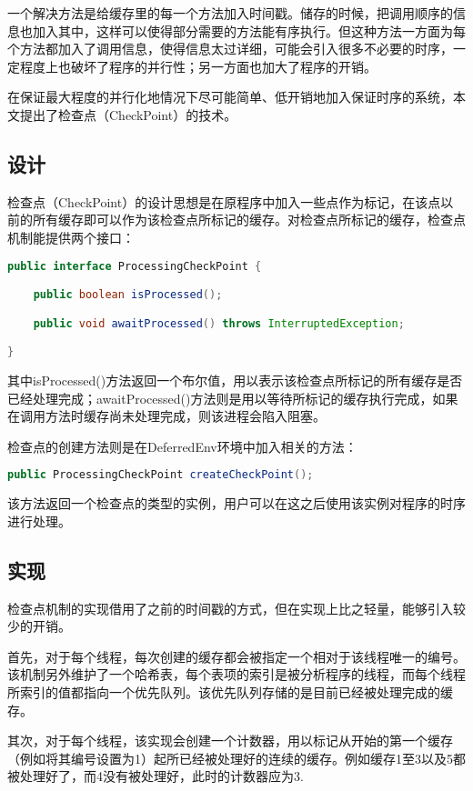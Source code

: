一个解决方法是给缓存里的每一个方法加入时间戳。储存的时候，把调用顺序的信息也加入其中，这样可以使得部分需要的方法能有序执行。但这种方法一方面为每个方法都加入了调用信息，使得信息太过详细，可能会引入很多不必要的时序，一定程度上也破坏了程序的并行性；另一方面也加大了程序的开销。

在保证最大程度的并行化地情况下尽可能简单、低开销地加入保证时序的系统，本文提出了检查点（CheckPoint）的技术。

\subsection{设计}

检查点（CheckPoint）的设计思想是在原程序中加入一些点作为标记，在该点以前的所有缓存即可以作为该检查点所标记的缓存。对检查点所标记的缓存，检查点机制能提供两个接口：

\begin{lstlisting}[language=Java]
public interface ProcessingCheckPoint {

	public boolean isProcessed();

	public void awaitProcessed() throws InterruptedException;

}
\end{lstlisting}

其中isProcessed()方法返回一个布尔值，用以表示该检查点所标记的所有缓存是否已经处理完成；awaitProcessed()方法则是用以等待所标记的缓存执行完成，如果在调用方法时缓存尚未处理完成，则该进程会陷入阻塞。

检查点的创建方法则是在DeferredEnv环境中加入相关的方法：

\begin{lstlisting}[language=Java]
	public ProcessingCheckPoint createCheckPoint();
\end{lstlisting}

该方法返回一个检查点的类型的实例，用户可以在这之后使用该实例对程序的时序进行处理。

\subsection{实现}

检查点机制的实现借用了之前的时间戳的方式，但在实现上比之轻量，能够引入较少的开销。

首先，对于每个线程，每次创建的缓存都会被指定一个相对于该线程唯一的编号。该机制另外维护了一个哈希表，每个表项的索引是被分析程序的线程，而每个线程所索引的值都指向一个优先队列。该优先队列存储的是目前已经被处理完成的缓存。

其次，对于每个线程，该实现会创建一个计数器，用以标记从开始的第一个缓存（例如将其编号设置为1）起所已经被处理好的连续的缓存。例如缓存1至3以及5都被处理好了，而4没有被处理好，此时的计数器应为3.

